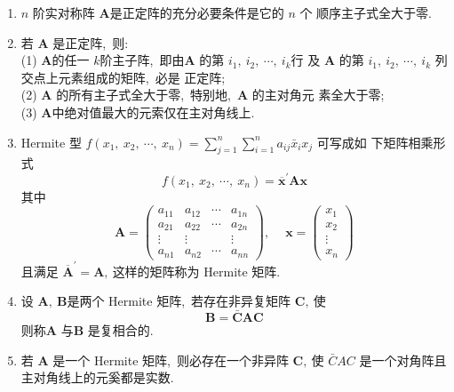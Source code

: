 \begin{enumerate}
$$\begin{array}{cccc}
			\vdots & \vdots & & \vdots \\
			a_{k 1} & a_{k 2} & \cdots & a_{k k}
		\end{array}\right| \quad(k=1,\ 2,\  \cdots,\  n)$$
		称为  $\boldsymbol{A}  $的顺序圭子式.
		\item  $n$  阶实对称阵  $\boldsymbol{A}  $是正定阵的充分必要条件是它的 $ n $ 个 顺序主子式全大于零.
		\item 若 $ \boldsymbol{A}$  是正定阵,\  则:\\
		(1) $ \boldsymbol{A}  $的任一  $k  $阶主子阵,\  即由$  \boldsymbol{A} $ 的第  $i_{1},\  i_{2},\  \cdots,\  i_{k}  $行 及  $\boldsymbol{A} $ 的第  $i_{1},\  i_{2},\  \cdots,\  i_{k} $ 列交点上元素组成的矩阵,\  必是 正定阵;\\
		(2)  $\boldsymbol{A}$  的所有主子式全大于零,\  特别地,\  $ \boldsymbol{A} $ 的主对角元 素全大于零;\\
		(3) $ \boldsymbol{A}  $中绝对值最大的元索仅在主对角线上.
		\item Hermite 型  $f\left(x_{1},\  x_{2},\  \cdots,\  x_{n}\right)=\sum_{j=1}^{n} \sum_{i=1}^{n} a_{i j} \bar{x}_{i} x_{j} $ 可写成如 下矩阵相乘形式
		$$f\left(x_{1},\  x_{2},\  \cdots,\  x_{n}\right)=\overline{\boldsymbol{x}}^{\prime} \boldsymbol{A} \boldsymbol{x}$$
		其中
		$$\boldsymbol{A}=\left(\begin{array}{cccc}
			a_{11} & a_{12} & \cdots & a_{1 n} \\
			a_{21} & a_{22} & \cdots & a_{2 n} \\
			\vdots & \vdots & & \vdots \\
			a_{n 1} & a_{n 2} & \cdots & a_{n n}
		\end{array}\right),\  \quad \boldsymbol{x}=\left(\begin{array}{c}
			x_{1} \\
			x_{2} \\
			\vdots \\
			x_{n}
		\end{array}\right)$$
		且满足  $\overline{\boldsymbol{A}}^{\prime}=\boldsymbol{A} ,\  $这样的矩阵称为 Hermite 矩阵.
		\item 设 $ \boldsymbol{A},\  \boldsymbol{B}  $是两个 Hermite 矩阵,\  若存在非异复矩阵  $\boldsymbol{C} ,\  $使
		$$\boldsymbol{B}=\bar{\boldsymbol{C}} \boldsymbol{A} \boldsymbol{C}$$
		则称$  \boldsymbol{A} $ 与$  \boldsymbol{B} $ 是复相合的.
		\item 若 $ \boldsymbol{A} $ 是一个 Hermite 矩阵,\  则必存在一个非异阵  $\boldsymbol{C} ,\  $使 $ \bar{C} A C$  是一个对角阵且主对角线上的元奚都是实数.

\end{enumerate}
